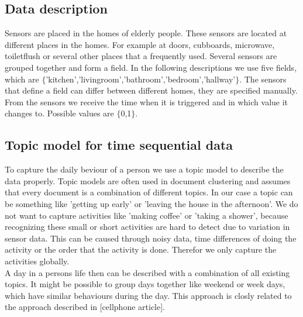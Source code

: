 \documentclass[11pt,a4paper]{article}
\begin{document}
\subsection{Data description}
Sensors are placed in the homes of elderly people. These sensors are located at different places in the homes. For example at doors, cubboards, microwave, toiletflush or several other places that a frequently used. Several sensors are grouped together and form a field. In the following descriptions we use five fields, which are $\{$'kitchen','livingroom','bathroom','bedroom','hallway'$\}$. The sensors that define a field can differ between different homes, they are specified manually.
From the sensors we receive the time when it is triggered and in which value it changes to. Possible values are $\{$0,1$\}$.

\subsection{Topic model for time sequential data}
To capture the daily beviour of a person we use a topic model to describe the data properly. Topic models are often used in document clustering and assumes that every document is a combination of different topics. In our case a topic can be something like 'getting up early' or 'leaving the house in the afternoon'. We do not want to capture activities like 'making coffee' or 'taking a shower', because recognizing these small or short activities are hard to detect due to variation in sensor data. This can be caused through noisy data, time differences of doing the activity or the order that the activity is done.
Therefor we only capture the activities globally.\\
A day in a persons life then can be described with a combination of all existing topics. It might be possible to group days together like weekend or week days, which have similar behaviours during the day. This approach is closly related to the approach described in [cellphone article].
\end{document}
